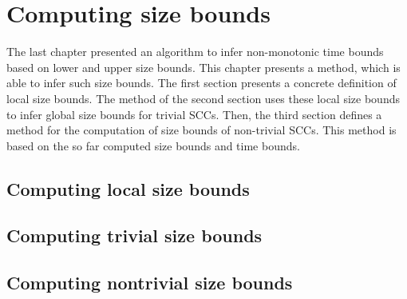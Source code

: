 \section{Computing size bounds}

The last chapter presented an algorithm to infer non-monotonic time bounds based on lower and upper size bounds.
This chapter presents a method, which is able to infer such size bounds.
The first section presents a concrete definition of local size bounds.
The method of the second section uses these local size bounds to infer global size bounds for trivial SCCs.
Then, the third section defines a method for the computation of size bounds of non-trivial SCCs.
This method is based on the so far computed size bounds and time bounds.

\subsection{Computing local size bounds}



\subsection{Computing trivial size bounds}



\subsection{Computing nontrivial size bounds}


